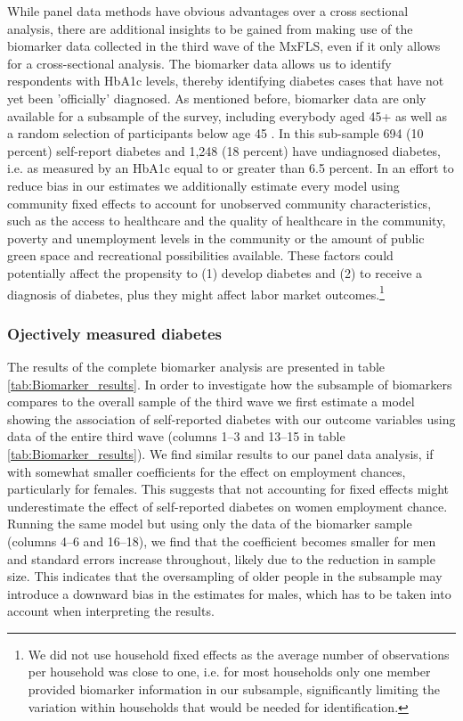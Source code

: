 \documentclass[12pt,english,british]{article}
\begin{document}
While panel data methods have obvious advantages over a cross sectional
analysis, there are additional insights
to be gained from making use of the biomarker data collected in the
third wave of the \ac{MxFLS}, even if it only allows for a cross-sectional
analysis. The biomarker data allows us to identify respondents with
\ac{HbA1c} levels, thereby identifying diabetes cases that have
not yet been 'officially' diagnosed. As mentioned before, biomarker
data are only available for a subsample of the survey, including everybody
aged 45+ as well as a random selection of participants below age 45
\citep{Crimmins2015}. In this sub-sample 694 (10 percent) self-report
diabetes and 1,248 (18 percent) have undiagnosed diabetes, i.e. as
measured by an \ac{HbA1c} equal to or greater than 6.5 percent. In an effort to reduce bias in our estimates we additionally estimate every model using community fixed effects to account for unobserved community characteristics, such as the access to healthcare and the quality of healthcare in the community, poverty and unemployment levels in the community or the amount of public green space and recreational possibilities available. These factors could potentially affect the propensity to (1) develop diabetes and (2) to receive a diagnosis of diabetes, plus they might affect labor market outcomes.\footnote{We did not use household fixed effects as the average number of observations per household was close to one, i.e. for most households only one member provided biomarker information in our subsample,  significantly limiting the variation within households that would be needed for identification.}


\subsubsection*{Ojectively measured diabetes}


The results of the complete biomarker analysis are presented in table \ref{tab:Biomarker_results}. In order to investigate how the subsample of biomarkers compares to the overall sample of the third wave we first estimate a model showing the association of self-reported diabetes with our outcome variables using data of the entire third wave (columns 1--3 and 13--15 in table \ref{tab:Biomarker_results}). We find similar results to our panel data analysis, if with somewhat smaller coefficients for the effect on employment chances, particularly for females. This suggests that not accounting for fixed effects might underestimate the effect of self-reported diabetes on women employment chance. Running the same model but using only the data of the biomarker sample (columns 4--6 and 16--18), we find that the coefficient becomes smaller for men and standard errors increase throughout, likely due to the reduction in sample size. This indicates that the oversampling of older people in the subsample may introduce a downward bias in the estimates for males, which has to be taken into account when interpreting the results.
\end{document}
